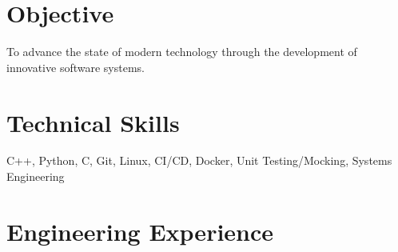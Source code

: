 \documentclass[10pt,final,sans]{resume}
\begin{document}
\setlength\headheight{36pt} %

\section{Objective}
To advance the state of modern technology through the development of innovative software systems. \\

\section{Technical Skills}
C++, Python, C, Git, Linux, CI/CD, Docker, Unit Testing/Mocking, Systems Engineering

\section{Engineering Experience}
\end{document}
